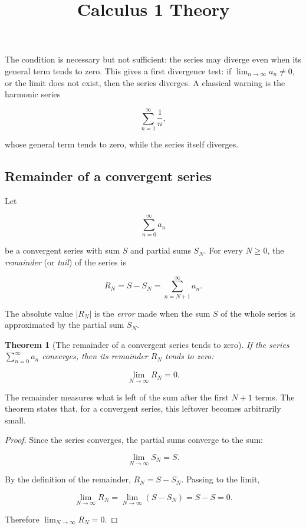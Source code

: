 \documentclass[11pt,a4paper]{article} \usepackage[T1]{fontenc}
\theoremstyle{plain} \newtheorem{theorem}{Theorem} \title{Calculus 1 Theory}
\begin{document}
The condition is necessary but not sufficient: the series may diverge even when
its general term tends to zero. This gives a first divergence test: if
$\lim_{n\to\infty} a_n\neq 0$, or the limit does not exist, then the series
diverges. A classical warning is the harmonic series

\[
\sum_{n=1}^{\infty} \frac{1}{n},
\]

whose general term tends to zero, while the series itself diverges.

\subsection {Remainder of a convergent series}

\begin{definition}
 Let

\[
\sum_{n=0}^{\infty} a_n
\]

be a convergent series with sum $S$ and partial sums $S_N$. For every $N\ge 0$,
the \emph{remainder} (or \emph{tail}) of the series is

\[
R_N = S - S_N = \sum_{n=N+1}^{\infty} a_n.
\]

The absolute value $|R_N|$ is the \emph{error} made when the sum $S$ of the
whole series is approximated by the partial sum $S_N$.
\end{definition}

\begin{theorem}
[The remainder of a convergent series tends to zero] If the series
$\sum_{n=0}^{\infty} a_n$ converges, then its remainder $R_N$ tends to zero:

\[
\lim_{N\to\infty} R_N = 0.
\]

\end{theorem}

The remainder measures what is left of the sum after the first $N+1$ terms. The
theorem states that, for a convergent series, this leftover becomes arbitrarily
small.

\begin{proof}
Since the series converges, the partial sums converge to the sum:

\[
\lim_{N\to\infty} S_N = S.
\]

By the definition of the remainder, $R_N = S - S_N$. Passing to the limit,

\[
\lim_{N\to\infty} R_N
= \lim_{N\to\infty} (S - S_N)
= S - S = 0.
\]

Therefore $\lim_{N\to\infty} R_N = 0$.
\end{proof}
\end{document}
